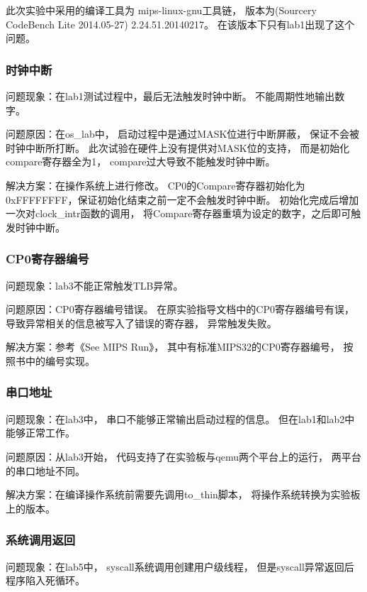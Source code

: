             此次实验中采用的编译工具为%
            mips-linux-gnu工具链，%
            版本为(Sourcery CodeBench Lite 2014.05-27)%
            2.24.51.20140217。%
            在该版本下只有lab1出现了这个问题。

        \subsubsection{时钟中断}
            问题现象：在lab1测试过程中，最后无法触发时钟中断。%
            不能周期性地输出数字。

            问题原因：在os\_lab中，%
            启动过程中是通过MASK位进行中断屏蔽，%
            保证不会被时钟中断所打断。%
            此次试验在硬件上没有提供对MASK位的支持，%
            而是初始化compare寄存器全为1，%
            compare过大导致不能触发时钟中断。

            解决方案：在操作系统上进行修改。%
            CP0的Compare寄存器初始化为0xFFFFFFFF，保证初始化结束之前一定不会触发时钟中断。%
            初始化完成后增加一次对clock\_intr函数的调用，%
            将Compare寄存器重填为设定的数字，之后即可触发时钟中断。

        \subsubsection{CP0寄存器编号}
            问题现象：lab3不能正常触发TLB异常。

            问题原因：CP0寄存器编号错误。%
            在原实验指导文档中的CP0寄存器编号有误，%
            导致异常相关的信息被写入了错误的寄存器，%
            异常触发失败。%

            解决方案：参考《See MIPS Run》，%
            其中有标准MIPS32的CP0寄存器编号，%
            按照书中的编号实现。

        \subsubsection{串口地址}
            问题现象：在lab3中，%
            串口不能够正常输出启动过程的信息。%
            但在lab1和lab2中能够正常工作。

            问题原因：从lab3开始，%
            代码支持了在实验板与qemu两个平台上的运行，%
            两平台的串口地址不同。

            解决方案：在编译操作系统前需要先调用to\_thin脚本，%
            将操作系统转换为实验板上的版本。

        \subsubsection{系统调用返回}
            问题现象：在lab5中，%
            syscall系统调用创建用户级线程，%
            但是syscall异常返回后程序陷入死循环。

